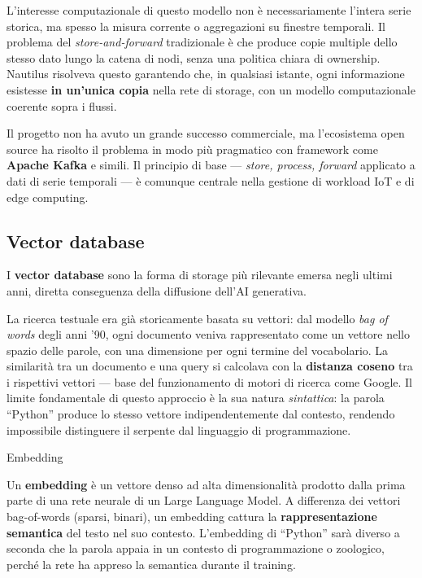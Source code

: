 \documentclass[
  italian,
  openany]{book}
\begin{document}
L'interesse computazionale di questo modello non è necessariamente
l'intera serie storica, ma spesso la misura corrente o aggregazioni su
finestre temporali. Il problema del \emph{store-and-forward}
tradizionale è che produce copie multiple dello stesso dato lungo la
catena di nodi, senza una politica chiara di ownership. Nautilus
risolveva questo garantendo che, in qualsiasi istante, ogni informazione
esistesse \textbf{in un'unica copia} nella rete di storage, con un
modello computazionale coerente sopra i flussi.

Il progetto non ha avuto un grande successo commerciale, ma l'ecosistema
open source ha risolto il problema in modo più pragmatico con framework
come \textbf{Apache Kafka} e simili. Il principio di base ---
\emph{store, process, forward} applicato a dati di serie temporali --- è
comunque centrale nella gestione di workload IoT e di edge computing.

\subsection{Vector database}\label{vector-database}

I \textbf{vector database} sono la forma di storage più rilevante emersa
negli ultimi anni, diretta conseguenza della diffusione dell'AI
generativa.

La ricerca testuale era già storicamente basata su vettori: dal modello
\emph{bag of words} degli anni '90, ogni documento veniva rappresentato
come un vettore nello spazio delle parole, con una dimensione per ogni
termine del vocabolario. La similarità tra un documento e una query si
calcolava con la \textbf{distanza coseno} tra i rispettivi vettori ---
base del funzionamento di motori di ricerca come Google. Il limite
fondamentale di questo approccio è la sua natura \emph{sintattica}: la
parola ``Python'' produce lo stesso vettore indipendentemente dal
contesto, rendendo impossibile distinguere il serpente dal linguaggio di
programmazione.

\begin{calloutdefinition}{Embedding}

Un \textbf{embedding} è un vettore denso ad alta dimensionalità prodotto
dalla prima parte di una rete neurale di un Large Language Model. A
differenza dei vettori bag-of-words (sparsi, binari), un embedding
cattura la \textbf{rappresentazione semantica} del testo nel suo
contesto. L'embedding di ``Python'' sarà diverso a seconda che la parola
appaia in un contesto di programmazione o zoologico, perché la rete ha
appreso la semantica durante il training.

\end{calloutdefinition}
\end{document}
